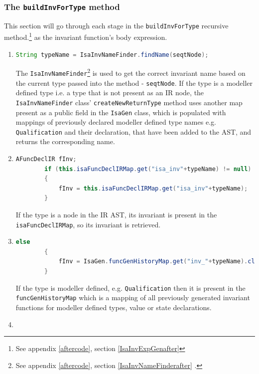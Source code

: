     \subsubsection{The \lstinline[language=Java]{buildInvForType} method} \label{bift}
    This section will go through each stage in the \lstinline[language=Java]{buildInvForType} recursive method.\footnote{See appendix \ref{aftercode}, section \ref{IsaInvExpGenafter}} 
    as the invariant function's body expression. 
	\begin{enumerate}
		\item \begin{lstlisting}[language=Java]
		String typeName = IsaInvNameFinder.findName(seqtNode);
		\end{lstlisting}
		The \lstinline[language=Java]{IsaInvNameFinder}\footnote{See appendix \ref{aftercode}, section \ref{IsaInvNameFinderafter} .} is used to get the correct invariant name based on the current type passed into the method - \lstinline[language=Java]{seqtNode}. If the type is a modeller defined type i.e. a type that is not present as an IR node, the \lstinline[language=Java]{IsaInvNameFinder} class' \lstinline[language=Java]{createNewReturnType} method uses another map present as a public field in the \lstinline[language=Java]{IsaGen} class, which is populated with mappings of previously declared modeller defined type names e.g. \lstinline[language=Java]{Qualification} and their declaration, that have been added to the AST, and returns the corresponding name.
		\item \begin{lstlisting}[language=Java]
		AFuncDeclIR fInv;
    	if (this.isaFuncDeclIRMap.get("isa_inv"+typeName) != null)
    	{
    		fInv = this.isaFuncDeclIRMap.get("isa_inv"+typeName);
    	}
		\end{lstlisting}
		If the type is a node in the IR AST, its invariant is present in the \lstinline[language=Java]{isaFuncDeclIRMap}, so its invariant is retrieved.
		\item \begin{lstlisting}[language=Java]
		else
    	{
    		fInv = IsaGen.funcGenHistoryMap.get("inv_"+typeName).clone();
    	}
		\end{lstlisting}
		If the type is modeller defined, e.g. \lstinline[language=Java]{Qualification} then it is present in the \lstinline[language=Java]{funcGenHistoryMap} which is a mapping of all previously generated invariant functions for modeller defined types, value or state declarations.
		\item \begin{lstlisting}[language=Java]

\end{lstlisting}
\end{enumerate}
